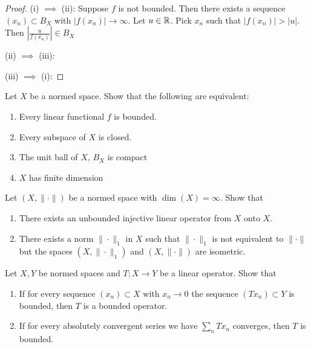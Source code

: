\documentclass{article}
\begin{document}
\begin{proof}
(i) $\implies$ (ii): Suppose $f$ is not bounded. Then there exists a sequence $(x_n) \subset B_X$ with $|f(x_n)| \to \infty$.  Let $u \in \mathbb{R}$.  Pick $x_n$ such that $|f(x_n)| > |u|$.  Then $\left| \frac {u}{f(x_n)} \right| \in B_X$

(ii) $\implies$ (iii): 

(iii) $\implies$ (i): 
\end{proof}


 Let $X$ be a normed space. Show that the following are equivalent:
\begin{enumerate}
\item Every linear functional $f$ is bounded.
\item Every subspace of $X$ is closed.
\item The unit ball of $X$, $B_X$ is compact
\item $X$ has finite dimension
\end{enumerate}

 Let $(X, \| \cdot \|)$ be a normed space with $\dim(X) = \infty$. Show that
\begin{enumerate}
\item There exists an unbounded injective linear operator from $X$ onto $X$.
\item There exists a norm $\| \cdot \|_1$ in $X$ such that $\|\cdot \|_1$ is not equivalent to $\| \cdot \|$ but the spaces $(X, \| \cdot \|_1)$ and $(X, \| \cdot \|)$ are isometric.
\end{enumerate}

 Let $X, Y$ be normed spaces and $T; X \to Y$ be a linear operator. Show that 
\begin{enumerate}
\item If for every sequence $(x_n) \subset X$ with $x_n \to 0$ the sequence $(Tx_n) \subset Y$ is bounded, then $T$ is a bounded operator.
\item If for every absolutely convergent series we have $\sum_n Tx_n$ converges, then $T$ is bounded.
\end{enumerate}
\end{document}
